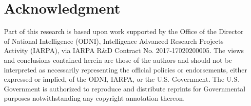 \documentclass[journal]{IEEEtran}
\begin{document}
\section*{Acknowledgment}

Part of this research is based upon work supported by the Office of the
Director of National Intelligence (ODNI), Intelligence Advanced Research
Projects Activity (IARPA), via IARPA R\&D Contract No. 2017-17020200005.
The views and conclusions contained herein are those of the authors and
should not be interpreted as necessarily representing the official
policies or endorsements, either expressed or implied, of the ODNI,
IARPA, or the U.S. Government. The U.S. Government is authorized to
reproduce and distribute reprints for Governmental purposes
notwithstanding any copyright annotation thereon.

\ifCLASSOPTIONcaptionsoff
  \newpage
\fi



\end{document}
